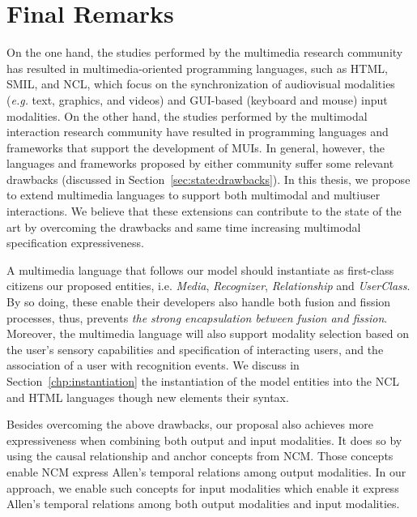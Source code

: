 \documentclass[
  doutorado,
  american
]{ThesisPUC}
\newcommand{\sect}[1]{Section~\ref{#1}}
\begin{document}
\chapter{Final Remarks}
\label{chp:final}

On the one hand, the studies performed by the multimedia research community has
resulted in multimedia-oriented programming languages, such as HTML, SMIL, and
NCL, which focus on the synchronization of audiovisual modalities (\textit{e.g.} text,
graphics, and videos) and GUI-based (keyboard and mouse) input modalities. On
the other hand, the studies performed by the multimodal interaction research
community have resulted in programming languages and frameworks that support the
development of MUIs. In general, however, the languages and frameworks proposed
by either community suffer some relevant drawbacks (discussed in 
\sect{sec:state:drawbacks}).
In this thesis, we propose to extend multimedia languages to support both
multimodal and multiuser interactions. We believe that these extensions can
contribute to the state of the art by overcoming the drawbacks and same time
increasing multimodal specification expressiveness.

A multimedia language that follows our model should instantiate as first-class 
citizens our proposed entities, i.e. \textit{Media}, \textit{Recognizer}, 
\textit{Relationship} and \textit{UserClass}. By so doing, these enable their 
developers also handle both fusion and fission processes, thus, 
prevents\textit{ the strong encapsulation between fusion and fission}. 
Moreover, the multimedia language will also support modality selection based on 
the user’s sensory capabilities and specification of interacting users, and the 
association of a user with recognition events. We discuss in 
\sect{chp:instantiation} the instantiation of the model entities into the NCL 
and HTML languages though new elements their syntax. 

Besides overcoming the above drawbacks, our proposal also achieves more
expressiveness when combining both output and input modalities. It does so by
using the causal relationship and anchor concepts from NCM. Those concepts
enable NCM express Allen’s temporal relations among output modalities. In our
approach, we enable such concepts for input modalities which enable it express
Allen’s temporal relations among both output modalities and input modalities.
\end{document}
